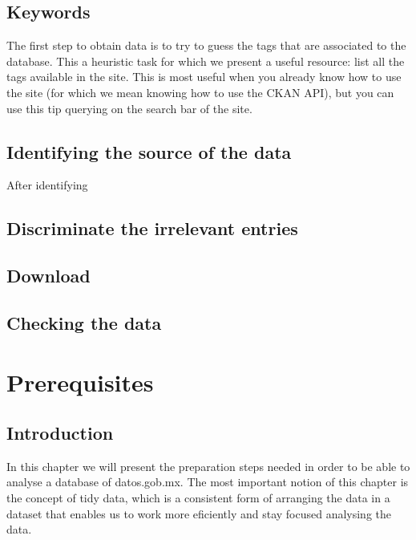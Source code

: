 \documentclass[]{book}
\begin{document}
\section{Keywords}\label{keywords}

The first step to obtain data is to try to guess the tags that are
associated to the database. This a heuristic task for which we present a
useful resource: list all the tags available in the site. This is most
useful when you already know how to use the site (for which we mean
knowing how to use the CKAN API), but you can use this tip querying on
the search bar of the site.

\section{Identifying the source of the
data}\label{identifying-the-source-of-the-data}

After identifying

\section{Discriminate the irrelevant
entries}\label{discriminate-the-irrelevant-entries}

\section{Download}\label{download}

\section{Checking the data}\label{checking-the-data}

\chapter{Prerequisites}\label{prerequisites}

\section{Introduction}\label{introduction-2}

In this chapter we will present the preparation steps needed in order to
be able to analyse a database of datos.gob.mx. The most important notion
of this chapter is the concept of tidy data, which is a consistent form
of arranging the data in a dataset that enables us to work more
eficiently and stay focused analysing the data.
\end{document}
